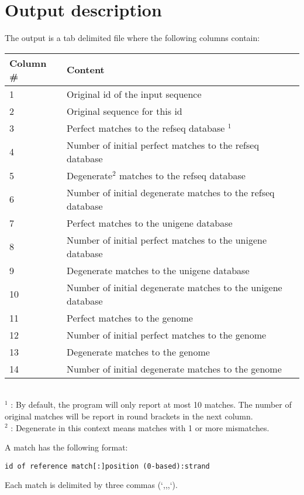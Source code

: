 \documentclass[a4paper,12pt]{article}
\begin{document}
 



\section{Output description}
\label{sec:outformat}

The output is a tab delimited file where the following columns contain: \\
\begin{tabular}{ll}
\hline
Column \# & Content \\
\hline
1 & Original id of the input sequence \\
2 & Original sequence for this id \\
3 & Perfect matches to the refseq database $^1$ \\
4 & Number of initial perfect matches to the refseq database \\
5 & Degenerate$^2$ matches to the refseq database  \\
6 & Number of initial degenerate matches to the refseq database \\
7 & Perfect matches to the unigene database  \\
8 & Number of initial perfect matches to the unigene database \\
9 & Degenerate matches to the unigene database  \\
10 & Number of initial degenerate matches to the unigene database \\
11 & Perfect matches to the genome  \\
12 & Number of initial perfect matches to the genome \\
13 & Degenerate matches to the genome  \\
14 & Number of initial degenerate matches to the genome \\
\hline
\end{tabular}
\\
$^1$ : By default, the program will only report at most 10 matches. The number of original matches will be report in round brackets in the next column. \\
$^2$ : Degenerate in this context means matches with 1 or more mismatches.

A match has the following format: 
\begin{verbatim}
id of reference match[:]position (0-based):strand
\end{verbatim}

Each match is delimited by three commas (`,,,`). 
\end{document}
